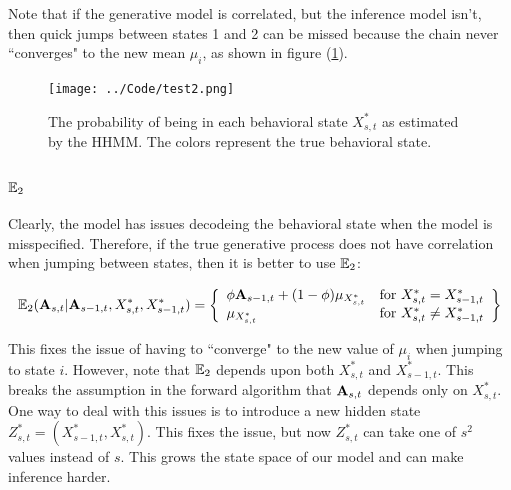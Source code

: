  Note that if the generative model is correlated, but the inference model isn't, then quick jumps between states 1 and 2 can be missed because the chain never ``converges" to the new mean $\mu_i$, as shown in figure (\ref{fig:STATE}).
 
\begin{figure}[h!]
	\centering
	\texttt{[image: ../Code/test2.png]}
	\caption{The probability of being in each behavioral state $X^*_{s,t}$ as estimated by the HHMM. The colors represent the true behavioral state.}
	\label{fig:STATE}
\end{figure}
 
 \subsubsection{$\mathbb{E}_2$}
 
Clearly, the model has issues decodeing the behavioral state when the model is misspecified. Therefore, if the true generative process does not have correlation when jumping between states, then it is better to use $\mathbb{E}_2$:

$$\mathbb{E}_2(\mathbf{A}_{s,t} | \mathbf{A}_{s-1,t}, X^*_{s,t}, X^*_{s-1,t}) = \left\{\begin{array}{lr}
\phi \mathbf{A}_{s-1,t} + (1-\phi) \mu_{X^*_{s,t}} & \text{for } X^*_{s,t} = X^*_{s-1,t}\\
\mu_{X^*_{s,t}} & \text{for } X^*_{s,t} \neq X^*_{s-1,t}
\end{array}\right\}$$

This fixes the issue of having to ``converge" to the new value of $\mu_i$ when jumping to state $i$. However, note that $\mathbb{E}_2$ depends upon both $X^*_{s,t}$ and $X^*_{s-1,t}$. This breaks the assumption in the forward algorithm that $\mathbf{A}_{s,t}$ depends only on $X^*_{s,t}$. One way to deal with this issues is to introduce a new hidden state $Z^*_{s,t} = (X^*_{s-1,t},X^*_{s,t})$. This fixes the issue, but now $Z^*_{s,t}$ can take one of $s^2$ values instead of $s$. This grows the state space of our model and can make inference harder.
 
 \fi
 
